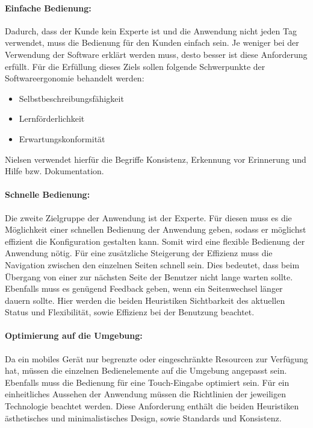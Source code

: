 \paragraph{Einfache Bedienung:} Dadurch, dass der Kunde kein Experte ist und die Anwendung nicht jeden Tag verwendet, muss die Bedienung für den Kunden einfach sein. Je weniger bei der Verwendung der Software erklärt werden muss, desto besser ist diese Anforderung erfüllt. Für die Erfüllung dieses Ziels sollen folgende Schwerpunkte der Softwareergonomie \cite{bib:softwareErgonomie} behandelt werden: 
\begin{itemize}
        \item Selbstbeschreibungsfähigkeit
        \item Lernförderlichkeit
        \item Erwartungskonformität
\end{itemize}
Nielsen verwendet hierfür die Begriffe Konsistenz, Erkennung vor Erinnerung und Hilfe bzw. Dokumentation.

\paragraph{Schnelle Bedienung:} Die zweite Zielgruppe der Anwendung ist der Experte. Für diesen muss es die Möglichkeit einer schnellen Bedienung der Anwendung geben, sodass er möglichst effizient die Konfiguration gestalten kann. Somit wird eine flexible Bedienung der Anwendung nötig. Für eine zusätzliche Steigerung der Effizienz muss die Navigation zwischen den einzelnen Seiten schnell sein. Dies bedeutet, dass beim Übergang von einer zur nächsten Seite der Benutzer nicht lange warten sollte. Ebenfalls muss es genügend Feedback geben, wenn ein Seitenwechsel länger dauern sollte. Hier werden die beiden Heuristiken Sichtbarkeit des aktuellen Status und Flexibilität, sowie Effizienz bei der Benutzung beachtet.

\paragraph{Optimierung auf die Umgebung: } Da ein mobiles Gerät nur begrenzte oder eingeschränkte Resourcen zur Verfügung hat, müssen die einzelnen Bedienelemente auf die Umgebung angepasst sein. Ebenfalls muss die Bedienung für eine Touch-Eingabe optimiert sein. 
Für ein einheitliches Aussehen der Anwendung müssen die Richtlinien der jeweiligen Technologie beachtet werden. Diese Anforderung enthält die beiden Heuristiken ästhetisches und minimalistisches Design, sowie Standards und Konsistenz.

